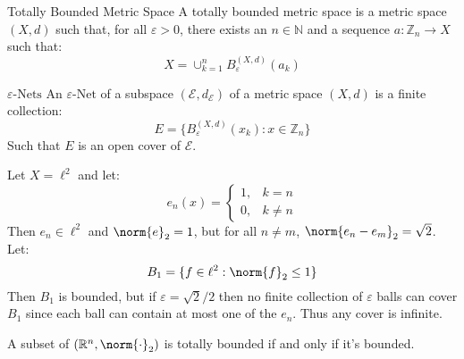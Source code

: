 \documentclass[crop=false,class=article,oneside]{standalone}
\begin{document}
            \begin{ldefinition}{Totally Bounded Metric Space}
                A totally bounded metric space is a metric space $(X,d)$ such
                that, for all $\varepsilon>0$, there exists an $n\in\mathbb{N}$
                and a sequence $a:\mathbb{Z}_{n}\rightarrow{X}$ such that:
                \begin{equation}
                    X=\cup_{k=1}^{n}B_{\varepsilon}^{(X,d)}(a_{k})
                \end{equation}
            \end{ldefinition}
            \begin{ldefinition}{$\varepsilon\textrm{-Nets}$}
                An $\varepsilon\textrm{-Net}$ of a subspace
                $(\mathcal{E},d_{\mathcal{E}})$ of a
                metric space $(X,d)$ is a finite collection:
                \begin{equation}
                    E=\{B_{\varepsilon}^(X,d)(x_{k}):x\in\mathbb{Z}_{n}\}
                \end{equation}
                Such that $E$ is an open cover of $\mathcal{E}$.
            \end{ldefinition}
            \begin{lexample}
                Let $X=\ell^{2}$ and let:
                \begin{equation}
                    e_{n}(x)=
                    \begin{cases}
                        1,&k=n\\
                        0,&k\ne{n}
                    \end{cases}
                \end{equation}
                Then $e_{n}\in\ell^{2}$ and $\norm{e}_{2}=1$, but for all
                $n\ne{m}$, $\norm{e_{n}-e_{m}}_{2}=\sqrt{2}$. Let:
                \begin{equation}
                    B_{1}=\{f\in\ell^{2}:\norm{f}_{2}\leq{1}\}
                \end{equation}
                Then $B_{1}$ is bounded, but if $\varepsilon=\sqrt{2}/2$ then
                no finite collection of $\varepsilon$ balls can cover
                $B_{1}$ since each ball can contain at most one of the
                $e_{n}$. Thus any cover is infinite.
            \end{lexample}
            \begin{theorem}
                A subset of $(\mathbb{R}^{n},\norm{\cdot}_{2})$ is totally
                bounded if and only if it's bounded.
            \end{theorem}
\end{document}
